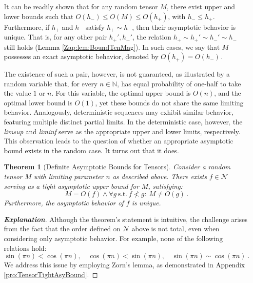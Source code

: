 \documentclass{article} %
\newtheorem{theorem}{Theorem}[section]
\begin{document}
It can be readily shown that for any random tensor \(M\), there exist upper and lower bounds such that
\(O\left(h_{-}\right)\leq O\left(M\right)\leq O\left(h_{+}\right)\),
with \(h_{-}\leq h_{+}\). Furthermore, if \(h_{+}\) and \(h_{-}\) satisfy \(h_+\sim h_-\), then their asymptotic behavior is unique. That is, for any other pair \(h_+', h_-'\), the relation
\(h_+\sim h_+'\sim h_-'\sim h_-\)
still holds (\textcolor{black}{Lemma \ref{Zap:lem:BoundTenMag}}). In such cases, we say that \(M\) possesses an exact asymptotic behavior, denoted by \(O\left(h_{+}\right)=O\left(h_{-}\right)\).

The existence of such a pair, however, is not guaranteed, as illustrated by a random variable that, for every \(n \in \mathbb{N}\), has equal probability of one-half to take the value \(1\) or \(n\). For this variable, the optimal upper bound is \(O(n)\), and the optimal lower bound is \(O(1)\), yet these bounds do not share the same limiting behavior. Analogously, deterministic sequences may exhibit similar behavior, featuring multiple distinct partial limits. In the deterministic case, however, the \textit{limsup} and \textit{liminf} serve as the appropriate upper and lower limits, respectively. This observation leads to the question of whether an appropriate asymptotic bound exists in the random case. It turns out that it does.

\begin{theorem}[Definite Asymptotic Bounds for Tensors]
\label{the:TensorTightAsyBound}
\textup{Consider a random tensor \(M\) with limiting parameter \(n\) as described above. There exists \(f\in\mathcal{N}\) serving as a tight asymptotic upper bound for \(M\), satisfying:
\begin{equation}
M=O\left(f\right)\land\forall g\ \text{s.t.}\ f\not<g:\ M\neq O\left(g\right)\ .
\end{equation}
Furthermore, the asymptotic behavior of \(f\) is unique.}
\end{theorem}

\begin{proof}[\textbf{Explanation}]
Although the theorem’s statement is intuitive, the challenge arises from the fact that the order defined on \(\mathcal{N}\) above is not total, even when considering only asymptotic behavior. For example, none of the following relations hold:
\begin{equation}
\sin\left(\pi n\right)<\cos\left(\pi n\right),\quad
\cos\left(\pi n\right)<\sin\left(\pi n\right),\quad
\sin\left(\pi n\right)\sim\cos\left(\pi n\right)\ .
\end{equation} 
We address this issue by employing Zorn’s lemma, as demonstrated in \textcolor{black}{Appendix \ref{pro:TensorTightAsyBound}}.
\end{proof}
\end{document}
